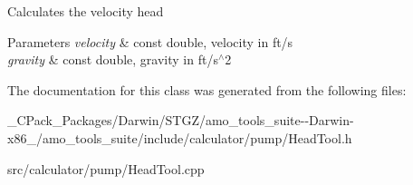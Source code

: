 Calculates the velocity head 
\begin{DoxyParams}{Parameters}
{\em velocity} & const double, velocity in ft/s \\
\hline
{\em gravity} & const double, gravity in ft/s$^\wedge$2 \\
\hline
\end{DoxyParams}


The documentation for this class was generated from the following files\+:\begin{DoxyCompactItemize}
\item 
\+\_\+\+C\+Pack\+\_\+\+Packages/\+Darwin/\+S\+T\+G\+Z/amo\+\_\+tools\+\_\+suite-\/-\/\+Darwin-\/x86\+\_/amo\+\_\+tools\+\_\+suite/include/calculator/pump/Head\+Tool.\+h\item 
src/calculator/pump/Head\+Tool.\+cpp\end{DoxyCompactItemize}
